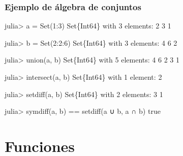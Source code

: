 \documentclass[
  letterpaper,
  DIV=11,
  numbers=noendperiod]{scrreprt}
\newenvironment{Shaded}{\begin{snugshade}}{\end{snugshade}}
\newcommand{\ConstantTok}[1]{\textcolor[rgb]{0.56,0.35,0.01}{#1}}
\newcommand{\DataTypeTok}[1]{\textcolor[rgb]{0.68,0.00,0.00}{#1}}
\newcommand{\FloatTok}[1]{\textcolor[rgb]{0.68,0.00,0.00}{#1}}
\newcommand{\FunctionTok}[1]{\textcolor[rgb]{0.28,0.35,0.67}{#1}}
\newcommand{\NormalTok}[1]{\textcolor[rgb]{0.00,0.23,0.31}{#1}}
\newcommand{\OperatorTok}[1]{\textcolor[rgb]{0.37,0.37,0.37}{#1}}
\begin{document}
\hypertarget{ejemplo-de-uxe1lgebra-de-conjuntos}{%
\subsection{Ejemplo de álgebra de
conjuntos}\label{ejemplo-de-uxe1lgebra-de-conjuntos}}

\begin{Shaded}
\begin{Highlighting}[]
\NormalTok{julia}\OperatorTok{\textgreater{}}\NormalTok{ a }\OperatorTok{=} \FunctionTok{Set}\NormalTok{(}\FloatTok{1}\OperatorTok{:}\FloatTok{3}\NormalTok{)}
\DataTypeTok{Set}\NormalTok{\{}\DataTypeTok{Int64}\NormalTok{\} with }\FloatTok{3}\NormalTok{ elements}\OperatorTok{:}
  \FloatTok{2}
  \FloatTok{3}
  \FloatTok{1}

\NormalTok{julia}\OperatorTok{\textgreater{}}\NormalTok{ b }\OperatorTok{=} \FunctionTok{Set}\NormalTok{(}\FloatTok{2}\OperatorTok{:}\FloatTok{2}\OperatorTok{:}\FloatTok{6}\NormalTok{)}
\DataTypeTok{Set}\NormalTok{\{}\DataTypeTok{Int64}\NormalTok{\} with }\FloatTok{3}\NormalTok{ elements}\OperatorTok{:}
  \FloatTok{4}
  \FloatTok{6}
  \FloatTok{2}

\NormalTok{julia}\OperatorTok{\textgreater{}} \FunctionTok{union}\NormalTok{(a, b)}
\DataTypeTok{Set}\NormalTok{\{}\DataTypeTok{Int64}\NormalTok{\} with }\FloatTok{5}\NormalTok{ elements}\OperatorTok{:}
  \FloatTok{4}
  \FloatTok{6}
  \FloatTok{2}
  \FloatTok{3}
  \FloatTok{1}

\NormalTok{julia}\OperatorTok{\textgreater{}} \FunctionTok{intersect}\NormalTok{(a, b)}
\DataTypeTok{Set}\NormalTok{\{}\DataTypeTok{Int64}\NormalTok{\} with }\FloatTok{1}\NormalTok{ element}\OperatorTok{:}
  \FloatTok{2}

\NormalTok{julia}\OperatorTok{\textgreater{}} \FunctionTok{setdiff}\NormalTok{(a, b)}
\DataTypeTok{Set}\NormalTok{\{}\DataTypeTok{Int64}\NormalTok{\} with }\FloatTok{2}\NormalTok{ elements}\OperatorTok{:}
  \FloatTok{3}
  \FloatTok{1}

\NormalTok{julia}\OperatorTok{\textgreater{}} \FunctionTok{symdiff}\NormalTok{(a, b) }\OperatorTok{==} \FunctionTok{setdiff}\NormalTok{(a }\OperatorTok{∪}\NormalTok{ b, a }\OperatorTok{∩}\NormalTok{ b)}
\ConstantTok{true}
\end{Highlighting}
\end{Shaded}


\hypertarget{funciones}{%
\chapter{Funciones}\label{funciones}}
\end{document}

